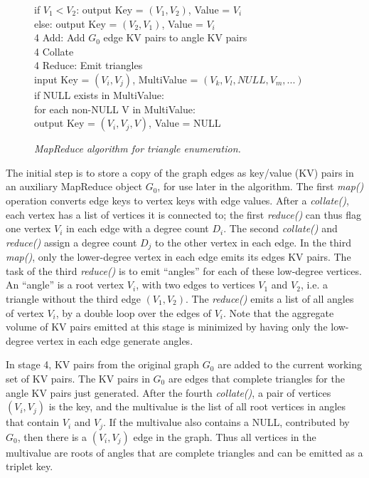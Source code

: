 \begin{figure}[htb]
\begin{center}
{\begin{minipage}{\textwidth}
\begin{tabbing}
	      \> \> \> \> if $V_1 < V_2$: output Key = $(V_1,V_2)$, Value = $V_i$ \\
	      \> \> \> \> else: output Key = $(V_2,V_1)$, Value = $V_i$ \\
4 Add: \> Add $G_0$ edge KV pairs to angle KV pairs \\
4 Collate \\
4 Reduce: \> Emit triangles \\
              \> \> input Key = $(V_i,V_j)$, MultiValue = $(V_k,V_l,NULL,V_m,...)$ \\
              \> \> if NULL exists in MultiValue: \\
	      \> \> \> for each non-NULL V in MultiValue: \\
	      \> \> \> \> output Key = $(V_i,V_j,V)$, Value = NULL

  \end{tabbing}
 \end{minipage}}\end{center}

 \caption{\it MapReduce algorithm for triangle enumeration.}

 \label{fig:tri}
\end{figure}

The initial step is to store a copy of the graph edges as key/value
(KV) pairs in an auxiliary MapReduce object $G_0$, for use later in
the algorithm.  The first {\it map()} operation converts edge keys to
vertex keys with edge values.  After a {\it collate()}, each vertex
has a list of vertices it is connected to; the first {\it reduce()}
can thus flag one vertex $V_i$ in each edge with a degree count $D_i$.
The second {\it collate()} and {\it reduce()} assign a degree count
$D_j$ to the other vertex in each edge.  In the third {\it map()},
only the lower-degree vertex in each edge emits its edges KV pairs.
The task of the third {\it reduce()} is to emit ``angles'' for each of
these low-degree vertices.  An ``angle'' is a root vertex $V_i$, with
two edges to vertices $V_1$ and $V_2$, i.e. a triangle without the
third edge $(V_1,V_2)$.  The {\it reduce()} emits a list of all angles
of vertex $V_i$, by a double loop over the edges of $V_i$.  Note that
the aggregate volume of KV pairs emitted at this stage is minimized by
having only the low-degree vertex in each edge generate angles.

In stage 4, KV pairs from the original graph $G_0$ are added to the
current working set of KV pairs.  The KV pairs in $G_0$ are edges that
complete triangles for the angle KV pairs just generated.  After the
fourth {\it collate()}, a pair of vertices $(V_i,V_j)$ is the key, and
the multivalue is the list of all root vertices in angles that contain
$V_i$ and $V_j$.  If the multivalue also contains a NULL, contributed
by $G_0$, then there is a $(V_i,V_j)$ edge in the graph.  Thus all
vertices in the multivalue are roots of angles that are complete
triangles and can be emitted as a triplet key.

